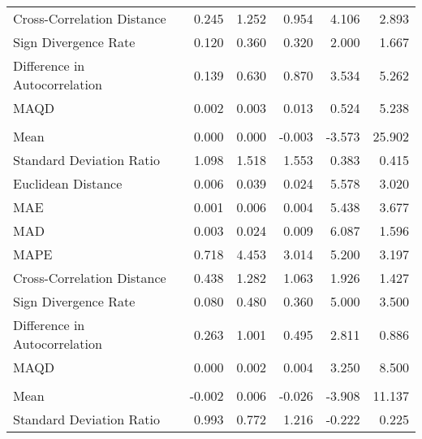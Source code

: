 \begin{landscape}
\begin{ThreePartTable}
\begin{longtable}[t]{lrrrrr}
\hspace{1em}Cross-Correlation Distance & 0.245 & 1.252 & 0.954 & 4.106 & 2.893\\
\hspace{1em}Sign Divergence Rate & 0.120 & 0.360 & 0.320 & 2.000 & 1.667\\
\hspace{1em}Difference in Autocorrelation & 0.139 & 0.630 & 0.870 & 3.534 & 5.262\\
\hspace{1em}MAQD & 0.002 & 0.003 & 0.013 & 0.524 & 5.238\\
\addlinespace[0.5em]
\multicolumn{6}{l}{\textbf{USA}}\\
\hline
\hspace{1em}Mean & 0.000 & 0.000 & -0.003 & -3.573 & 25.902\\
\hspace{1em}Standard Deviation Ratio & 1.098 & 1.518 & 1.553 & 0.383 & 0.415\\
\hspace{1em}Euclidean Distance & 0.006 & 0.039 & 0.024 & 5.578 & 3.020\\
\hspace{1em}MAE & 0.001 & 0.006 & 0.004 & 5.438 & 3.677\\
\hspace{1em}MAD & 0.003 & 0.024 & 0.009 & 6.087 & 1.596\\
\hspace{1em}MAPE & 0.718 & 4.453 & 3.014 & 5.200 & 3.197\\
\hspace{1em}Cross-Correlation Distance & 0.438 & 1.282 & 1.063 & 1.926 & 1.427\\
\hspace{1em}Sign Divergence Rate & 0.080 & 0.480 & 0.360 & 5.000 & 3.500\\
\hspace{1em}Difference in Autocorrelation & 0.263 & 1.001 & 0.495 & 2.811 & 0.886\\
\hspace{1em}MAQD & 0.000 & 0.002 & 0.004 & 3.250 & 8.500\\
\addlinespace[0.5em]
\multicolumn{6}{l}{\textbf{VNM}}\\
\hline
\hspace{1em}Mean & -0.002 & 0.006 & -0.026 & -3.908 & 11.137\\
\hspace{1em}Standard Deviation Ratio & 0.993 & 0.772 & 1.216 & -0.222 & 0.225\\

\end{longtable}
\end{ThreePartTable}
\end{landscape}
